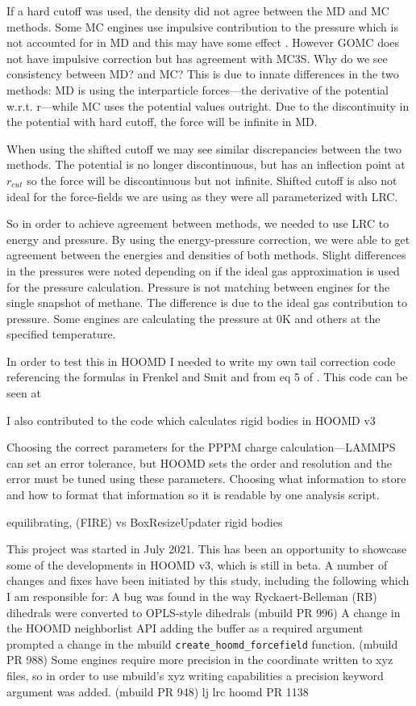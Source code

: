 If a hard cutoff was used, the density did not agree between the MD and MC methods.
Some MC engines use impulsive contribution to the pressure which is not accounted for in MD and this may have some effect \citep{frenkel2001understanding}.
However GOMC does not have impulsive correction but has agreement with MC3S. Why do we see consistency between MD? and MC?
This is due to innate differences in the two methods: MD is using the interparticle forces---the derivative of the potential w.r.t. r---while MC uses the potential values outright.
Due to the discontinuity in the potential with hard cutoff, the force will be infinite in MD.

When using the shifted cutoff we may see similar discrepancies between the two methods. 
The potential is no longer discontinuous, but has an inflection point at $r_{cut}$ so the force will be discontinuous but not infinite.
Shifted cutoff is also not ideal for the force-fields we are using as they were all parameterized with LRC. 

So in order to achieve agreement between methods, we needed to use LRC to energy and pressure. 
By using the energy-pressure correction, we were able to get agreement between the energies and densities of both methods. 
Slight differences in the pressures were noted depending on if the ideal gas approximation is used for the pressure calculation.
Pressure is not matching between engines for the single snapshot of methane. 
The difference is due to the ideal gas contribution to pressure. 
Some engines are calculating the pressure at 0K and others at the specified temperature.

In order to test this in HOOMD I needed to write my own tail correction code referencing the formulas in Frenkel and Smit  \citep{frenkel2001understanding} and from eq 5 of  \citep{Sun1998}. 
This code can be seen at %

I also contributed to the code which calculates rigid bodies in HOOMD v3 %

Choosing the correct parameters for the PPPM charge calculation---LAMMPS can set an error tolerance, but HOOMD sets the order and resolution and the error must be tuned using these parameters.
Choosing what information to store and how to format that information so it is readable by one analysis script. 

equilibrating, (FIRE) vs BoxResizeUpdater
rigid bodies

This project was started in July 2021. 
This has been an opportunity to showcase some of the developments in HOOMD v3, which is still in beta. 
A number of changes and fixes have been initiated by this study, including the following which I am responsible for:
A bug was found in the way Ryckaert-Belleman (RB) dihedrals were converted to OPLS-style dihedrals (mbuild PR 996)
A change in the HOOMD neighborlist API adding the buffer as a required argument prompted a change in the mbuild \lstinline{create_hoomd_forcefield} function. (mbuild PR 988)
Some engines require more precision in the coordinate written to xyz files, so in order to use mbuild's xyz writing capabilities a precision keyword argument was added. (mbuild PR 948)
lj lrc hoomd PR 1138

